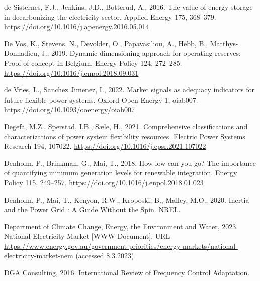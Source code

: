 \documentclass[12pt,a4paper,]{report}
\newlength{\cslhangindent}
\newenvironment{CSLReferences}[2] %
 {%
  \setlength{\parindent}{0pt}
  \ifodd #1 \everypar{\setlength{\hangindent}{\cslhangindent}}\ignorespaces\fi
  \ifnum #2 > 0
  \setlength{\parskip}{#2\baselineskip}
  \fi
 }%
 {}
\begin{document}
\begin{CSLReferences}{1}{0}
\leavevmode{}%
de Sisternes, F.J., Jenkins, J.D., Botterud, A., 2016. The value of
energy storage in decarbonizing the electricity sector. Applied Energy
175, 368--379. \url{https://doi.org/10.1016/j.apenergy.2016.05.014}

\leavevmode{}%
De Vos, K., Stevens, N., Devolder, O., Papavasiliou, A., Hebb, B.,
Matthys-Donnadieu, J., 2019. Dynamic dimensioning approach for operating
reserves: {Proof} of concept in {Belgium}. Energy Policy 124, 272--285.
\url{https://doi.org/10.1016/j.enpol.2018.09.031}

\leavevmode{}%
de Vries, L., Sanchez Jimenez, I., 2022. Market signals as adequacy
indicators for future flexible power systems. Oxford Open Energy 1,
oiab007. \url{https://doi.org/10.1093/ooenergy/oiab007}

\leavevmode{}%
Degefa, M.Z., Sperstad, I.B., Sæle, H., 2021. Comprehensive
classifications and characterizations of power system flexibility
resources. Electric Power Systems Research 194, 107022.
\url{https://doi.org/10.1016/j.epsr.2021.107022}

\leavevmode{}%
Denholm, P., Brinkman, G., Mai, T., 2018. How low can you go? {The}
importance of quantifying minimum generation levels for renewable
integration. Energy Policy 115, 249--257.
\url{https://doi.org/10.1016/j.enpol.2018.01.023}

\leavevmode{}%
Denholm, P., Mai, T., Kenyon, R.W., Kroposki, B., Malley, M.O., 2020.
Inertia and the {Power Grid} : {A Guide Without} the {Spin}. NREL.

\leavevmode{}%
Department of Climate Change, Energy, the Environment and Water, 2023.
National {Electricity Market} {[}WWW Document{]}. URL
\url{https://www.energy.gov.au/government-priorities/energy-markets/national-electricity-market-nem}
(accessed 8.3.2023).

\leavevmode{}%
DGA Consulting, 2016. International {Review} of {Frequency Control
Adaptation}.


\end{CSLReferences}
\end{document}
